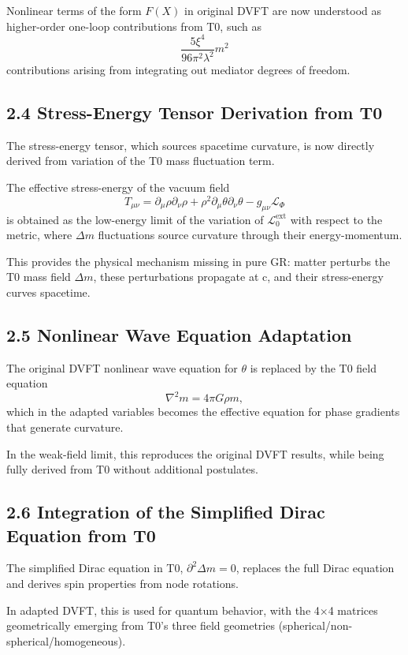 	Nonlinear terms of the form $F(X)$ in original DVFT are now understood as higher-order one-loop contributions from T0, such as
	\[
	\frac{5\xi^4}{96\pi^2 \lambda^2} m^2
	\]
	contributions arising from integrating out mediator degrees of freedom.
	
	\subsection{2.4 Stress-Energy Tensor Derivation from T0}
	
	The stress-energy tensor, which sources spacetime curvature, is now directly derived from variation of the T0 mass fluctuation term.
	
	The effective stress-energy of the vacuum field
	\[
	T_{\mu\nu} = \partial_\mu \rho \partial_\nu \rho + \rho^2 \partial_\mu \theta \partial_\nu \theta - g_{\mu\nu} \mathcal{L}_{\Phi}
	\]
	is obtained as the low-energy limit of the variation of $\mathcal{L}_0^{\text{ext}}$ with respect to the metric, where $\Delta m$ fluctuations source curvature through their energy-momentum.
	
	This provides the physical mechanism missing in pure GR: matter perturbs the T0 mass field $\Delta m$, these perturbations propagate at c, and their stress-energy curves spacetime.
	
	\subsection{2.5 Nonlinear Wave Equation Adaptation}
	
	The original DVFT nonlinear wave equation for $\theta$ is replaced by the T0 field equation
	\[
	\nabla^2 m = 4\pi G \rho m,
	\]
	which in the adapted variables becomes the effective equation for phase gradients that generate curvature.
	
	In the weak-field limit, this reproduces the original DVFT results, while being fully derived from T0 without additional postulates.
	
	\subsection{2.6 Integration of the Simplified Dirac Equation from T0}
	
	The simplified Dirac equation in T0, $\partial^2 \Delta m = 0$, replaces the full Dirac equation and derives spin properties from node rotations.
	
	In adapted DVFT, this is used for quantum behavior, with the 4×4 matrices geometrically emerging from T0's three field geometries (spherical/non-spherical/homogeneous).
	
